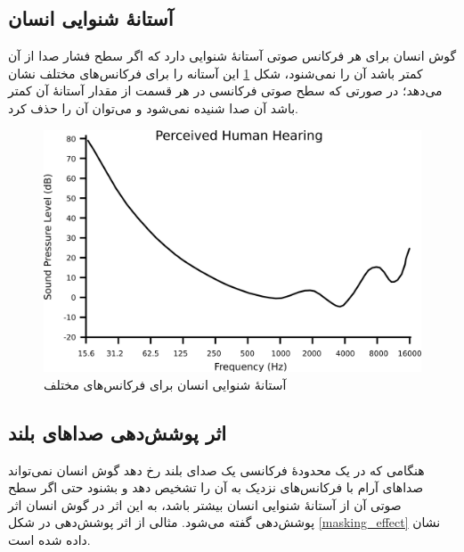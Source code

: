  \subsection{آستانهٔ شنوایی انسان}
 گوش انسان برای هر فرکانس صوتی آستانهٔ شنوایی دارد که اگر سطح فشار صدا از آن کمتر باشد آن را نمی‌شنود، 
 شکل 
 \ref{human_hearing}
 این آستانه را برای فرکانس‌های مختلف نشان می‌دهد؛ در صورتی که سطح صوتی فرکانسی در هر قسمت از مقدار آستانهٔ آن کمتر باشد آن صدا شنیده نمی‌شود و 
 می‌توان آن را حذف کرد.

 \begin{figure}[]
         \centering
         \includegraphics[width=\textwidth]{figs/human_hearing.png}
         \caption{آستانهٔ شنوایی انسان برای فرکانس‌های مختلف \cite{percieved_human_hearing}}
         \label{human_hearing}
 \end{figure}
 \subsection{اثر پوشش‌دهی صداهای بلند}
 هنگامی که در یک محدودهٔ فرکانسی یک صدای بلند رخ دهد گوش انسان نمی‌تواند صداهای آرام با فرکانس‌های نزدیک به آن را تشخیص دهد و بشنود
 حتی اگر سطح صوتی آن از آستانهٔ شنوایی انسان بیشتر باشد، به این اثر در گوش انسان اثر پوشش‌دهی 
 گفته می‌شود. 
 مثالی از اثر پوشش‌دهی در شکل 
 \ref{masking_effect}
 نشان داده شده است. 

